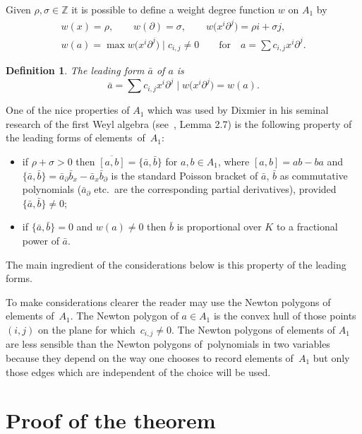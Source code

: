 \documentclass[pdftex]{sigma}
\numberwithin{equation}{section}
\newtheorem{Definition}[Theorem]{Definition}
\newcommand{\de}{\partial}
\newcommand{\Z}{\mathbb Z}
\begin{document}
Given $\rho, \sigma \in \Z$ it is possible to define a weight degree function $w$ on $A_1$ by
\begin{gather*}
w(x) = \rho,\qquad
w(\de) = \sigma, \qquad
w\big(x^i\de^j\big) = \rho i + \sigma j,
\\
w(a) = \max w\big(x^i\de^j\big)\mid c _{i,j} \neq 0\qquad \text{for}\quad a = \sum c_{i,j}x^i\de^j.
\end{gather*}

\begin{Definition}
 The leading form $\bar{a}$ of $a$ is
 \[
 \bar{a} = \sum c_{i,j}x^i\de^j\mid w\big(x^i\de^j\big) = w(a).
 \]
\end{Definition}

One of the nice properties of $A_1$ which was used by Dixmier in his seminal
research of the first Weyl algebra (see~\cite{D}, Lemma 2.7) is the following property of the leading
forms of ele\-ments~of~$A_1$:
\begin{itemize}\itemsep=0pt
\item if $\rho + \sigma > 0$ then $\overline{[a,b]} = \big\{\bar{a},\bar{b}\big\}$ for $a, b \in
A_1$, where $[a, b] = ab - ba$ and $\big\{\bar{a},\bar{b}\big\} = \bar{a}_{\de}\bar{b}_x
- \bar{a}_x\bar{b}_\de$ is the standard Poisson bracket of $\bar{a}$, $\bar{b}$
as commutative polynomials ($\bar{a}_{\de}$ etc.\ are the corresponding partial
derivatives), provided $\{\bar{a},\bar{b}\} \neq 0$;

\item if $\big\{\bar{a},\bar{b}\big\} = 0$ and $w(a) \ne 0$ then $\bar{b}$ is proportional over $K$ to a fractional power of $\bar{a}$.
\end{itemize}

The main ingredient of the considerations below is this property of the leading
forms.

To make considerations clearer the reader may use the Newton polygons of elements of~$A_1$.
The Newton polygon of $a \in A_1$ is the convex hull of those points $(i, j)$ on the plane for which~$c_{i,j} \neq 0$. The Newton polygons of elements
of $A_1$ are less sensible than the Newton polygons of~polynomials in two
variables because they depend on the way one chooses to record elements of~$A_1$
but only those edges which are independent of the choice will be used.

\section{Proof of the theorem}\label{pcp}
\end{document}
